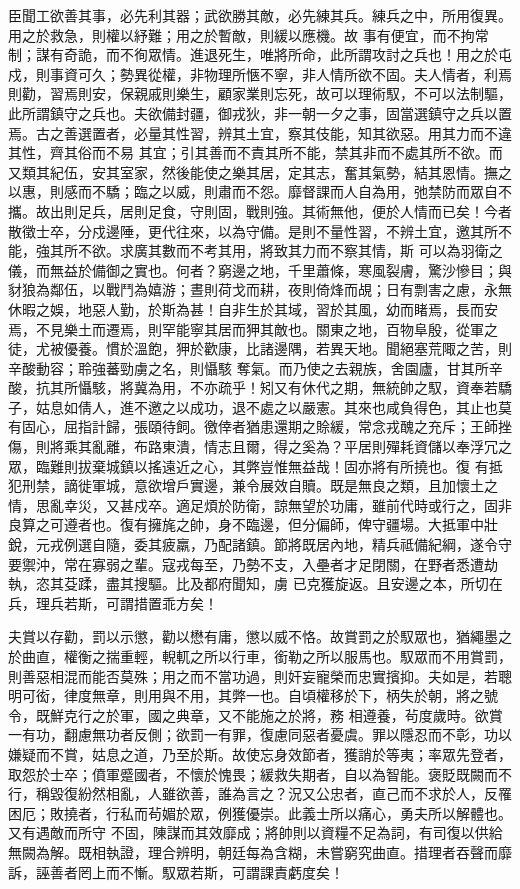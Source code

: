 \begin{pinyinscope}
 臣聞工欲善其事，必先利其器；武欲勝其敵，必先練其兵。練兵之中，所用復異。用之於救急，則權以紓難；用之於暫敵，則緩以應機。故
 事有便宜，而不拘常制；謀有奇詭，而不徇眾情。進退死生，唯將所命，此所謂攻討之兵也！用之於屯戍，則事資可久；勢異從權，非物理所愜不寧，非人情所欲不固。夫人情者，利焉則勸，習焉則安，保親戚則樂生，顧家業則忘死，故可以理術馭，不可以法制驅，此所謂鎮守之兵也。夫欲備封疆，御戎狄，非一朝一夕之事，固當選鎮守之兵以置焉。古之善選置者，必量其性習，辨其土宜，察其伎能，知其欲惡。用其力而不違其性，齊其俗而不易
 其宜；引其善而不責其所不能，禁其非而不處其所不欲。而又類其紀伍，安其室家，然後能使之樂其居，定其志，奮其氣勢，結其恩情。撫之以惠，則感而不驕；臨之以威，則肅而不怨。靡督課而人自為用，弛禁防而眾自不攜。故出則足兵，居則足食，守則固，戰則強。其術無他，便於人情而已矣！今者散徵士卒，分戍邊陲，更代往來，以為守備。是則不量性習，不辨土宜，邀其所不能，強其所不欲。求廣其數而不考其用，將致其力而不察其情，斯
 可以為羽衛之儀，而無益於備御之實也。何者？窮邊之地，千里蕭條，寒風裂膚，驚沙慘目；與豺狼為鄰伍，以戰鬥為嬉游；晝則荷戈而耕，夜則倚烽而覘；日有剽害之慮，永無休暇之娛，地惡人勤，於斯為甚！自非生於其域，習於其風，幼而睹焉，長而安焉，不見樂土而遷焉，則罕能寧其居而狎其敵也。關東之地，百物阜殷，從軍之徒，尤被優養。慣於溫飽，狎於歡康，比諸邊隅，若異天地。聞絕塞荒陬之苦，則辛酸動容；聆強蕃勁虜之名，則懾駭
 奪氣。而乃使之去親族，舍園廬，甘其所辛酸，抗其所懾駭，將冀為用，不亦疏乎！矧又有休代之期，無統帥之馭，資奉若驕子，姑息如倩人，進不邀之以成功，退不處之以嚴憲。其來也咸負得色，其止也莫有固心，屈指計歸，張頤待飼。徼倖者猶患還期之賒緩，常念戎醜之充斥；王師挫傷，則將乘其亂離，布路東潰，情志且爾，得之奚為？平居則殫耗資儲以奉浮冗之眾，臨難則拔棄城鎮以搖遠近之心，其弊豈惟無益哉！固亦將有所撓也。復
 有抵犯刑禁，謫徙軍城，意欲增戶實邊，兼令展效自贖。既是無良之類，且加懷土之情，思亂幸災，又甚戍卒。適足煩於防衛，諒無望於功庸，雖前代時或行之，固非良算之可遵者也。復有擁旄之帥，身不臨邊，但分偏師，俾守疆場。大抵軍中壯銳，元戎例選自隨，委其疲羸，乃配諸鎮。節將既居內地，精兵祗備紀綱，遂令守要禦沖，常在寡弱之輩。寇戎每至，乃勢不支，入壘者才足閉關，在野者悉遭劫執，恣其芟蹂，盡其搜驅。比及都府聞知，虜
 已克獲旋返。且安邊之本，所切在兵，理兵若斯，可謂措置乖方矣！



 夫賞以存勸，罰以示懲，勸以懋有庸，懲以威不恪。故賞罰之於馭眾也，猶繩墨之於曲直，權衡之揣重輕，輗軏之所以行車，銜勒之所以服馬也。馭眾而不用賞罰，則善惡相混而能否莫殊；用之而不當功過，則奸妄寵榮而忠實擯抑。夫如是，若聰明可衒，律度無章，則用與不用，其弊一也。自頃權移於下，柄失於朝，將之號令，既鮮克行之於軍，國之典章，又不能施之於將，務
 相遵養，茍度歲時。欲賞一有功，翻慮無功者反側；欲罰一有罪，復慮同惡者憂虞。罪以隱忍而不彰，功以嫌疑而不賞，姑息之道，乃至於斯。故使忘身效節者，獲誚於等夷；率眾先登者，取怨於士卒；僨軍蹙國者，不懷於愧畏；緩救失期者，自以為智能。褒貶既闕而不行，稱毀復紛然相亂，人雖欲善，誰為言之？況又公忠者，直己而不求於人，反罹困厄；敗撓者，行私而茍媚於眾，例獲優崇。此義士所以痛心，勇夫所以解體也。又有遇敵而所守
 不固，陳謀而其效靡成；將帥則以資糧不足為詞，有司復以供給無闕為解。既相執證，理合辨明，朝廷每為含糊，未嘗窮究曲直。措理者吞聲而靡訴，誣善者罔上而不慚。馭眾若斯，可謂課責虧度矣！




\end{pinyinscope}
